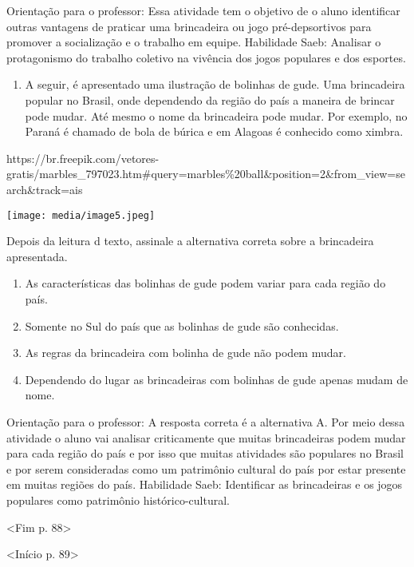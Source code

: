Orientação para o professor: Essa atividade tem o objetivo de o aluno
identificar outras vantagens de praticar uma brincadeira ou jogo
pré-depsortivos para promover a socialização e o trabalho em equipe.
Habilidade Saeb: Analisar o protagonismo do trabalho coletivo na
vivência dos jogos populares e dos esportes.

\begin{enumerate}
\def\labelenumi{\arabic{enumi}.}
\item
  A seguir, é apresentado uma ilustração de bolinhas de gude. Uma
  brincadeira popular no Brasil, onde dependendo da região do país a
  maneira de brincar pode mudar. Até mesmo o nome da brincadeira pode
  mudar. Por exemplo, no Paraná é chamado de bola de búrica e em Alagoas
  é conhecido como ximbra.
\end{enumerate}

https://br.freepik.com/vetores-gratis/marbles\_797023.htm\#query=marbles\%20ball\&position=2\&from\_view=search\&track=ais

\texttt{[image: media/image5.jpeg]}

Depois da leitura d texto, assinale a alternativa correta sobre a
brincadeira apresentada.

\begin{enumerate}
\def\labelenumi{\alph{enumi})}
\item
  As características das bolinhas de gude podem variar para cada região
  do país.
\item
  Somente no Sul do país que as bolinhas de gude são conhecidas.
\item
  As regras da brincadeira com bolinha de gude não podem mudar.
\item
  Dependendo do lugar as brincadeiras com bolinhas de gude apenas mudam
  de nome.
\end{enumerate}

Orientação para o professor: A resposta correta é a alternativa A. Por
meio dessa atividade o aluno vai analisar criticamente que muitas
brincadeiras podem mudar para cada região do país e por isso que muitas
atividades são populares no Brasil e por serem consideradas como um
patrimônio cultural do país por estar presente em muitas regiões do
país. Habilidade Saeb: Identificar as brincadeiras e os jogos populares
como patrimônio histórico-cultural.

\textless{}Fim p. 88\textgreater{}

\textless{}Início p. 89\textgreater{}

